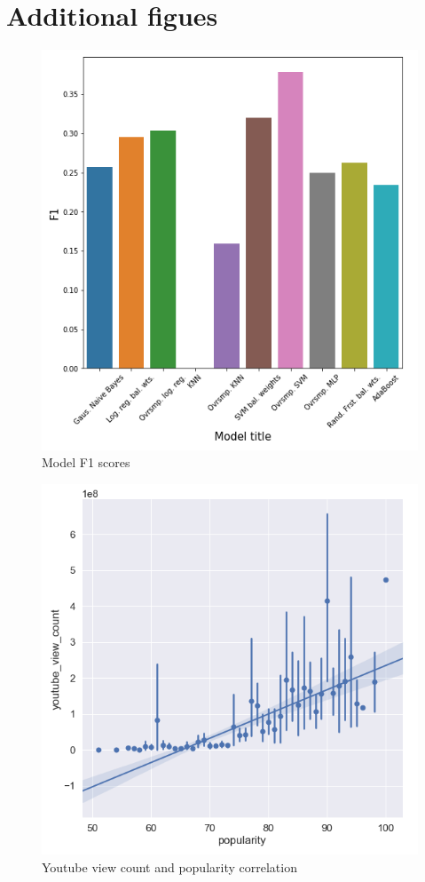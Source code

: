 \vspace{300pt}

\section{Additional figues}
\begin{figure}[h]
\centering
\includegraphics[width=0.62\linewidth]{appendix/fig/f1s.PNG}
\caption{Model F1 scores}
\label{fig:f1s}
\end{figure}
\begin{figure}[h]
\centering
\includegraphics[width=0.62\linewidth]{appendix/fig/correlation.PNG}
\caption{Youtube view count and popularity correlation}
\label{fig:ytcor}
\end{figure}



